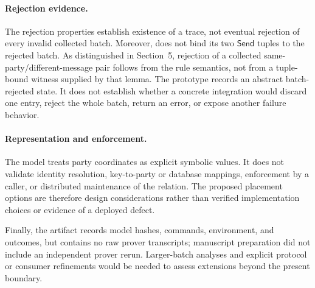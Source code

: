\paragraph{Rejection evidence.}
The rejection properties establish existence of a trace, not eventual
rejection of every invalid collected batch. Moreover,
 does not bind its two \(\mathsf{Send}\)
tuples to the rejected batch. As distinguished in Section~5, rejection of a
collected same-party/different-message pair follows from the rule semantics,
not from a tuple-bound witness supplied by that lemma.
The prototype records an abstract batch-rejected state. It does not establish
whether a concrete integration would discard one entry, reject the whole
batch, return an error, or expose another failure behavior.

\paragraph{Representation and enforcement.}
The model treats party coordinates as explicit symbolic values. It does not
validate identity resolution, key-to-party or database mappings, enforcement
by a caller, or distributed maintenance of the relation. The proposed
placement options are therefore design considerations rather than verified
implementation choices or evidence of a deployed defect.

Finally, the artifact records model hashes, commands, environment, and
outcomes, but contains no raw prover transcripts; manuscript preparation did
not include an independent prover rerun. Larger-batch analyses and explicit
protocol or consumer refinements would be needed to assess extensions beyond
the present boundary.
